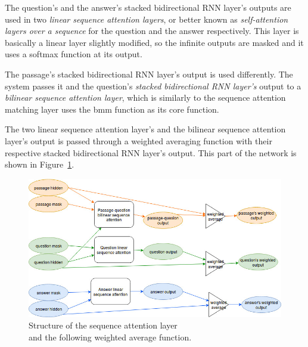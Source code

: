 The question's and the answer's stacked bidirectional RNN layer's outputs are used in two \textit{linear sequence attention layers}, or better known as \textit{self-attention layers over a sequence} for the question and the answer respectively. This layer is basically a linear layer slightly modified, so the infinite outputs are masked and it uses a softmax function at its output.

The passage's stacked bidirectional RNN layer's output is used differently. The system passes it and the question's \textit{stacked bidirectional RNN layer's} output to a \textit{bilinear sequence attention layer}, which is similarly to the sequence attention matching layer uses the bmm function as its core function.

The two linear sequence attention layer's and the bilinear sequence attention layer's output is passed through a weighted averaging function with their respective stacked bidirectional RNN layer's output. This part of the network is shown in Figure~\ref{fig:sequence_attention}.
\begin{figure}[h!]
	\centering
	\includegraphics[scale=0.5]{TriAN_sequence_attention.jpg}
	\caption{Structure of the sequence attention layer\\and the following weighted average function.}
	\label{fig:sequence_attention}
\end{figure}

